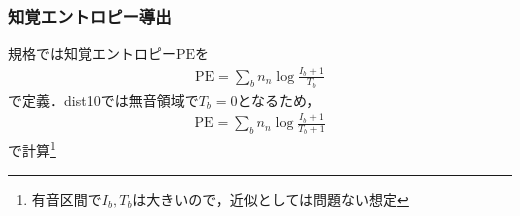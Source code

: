 \documentclass[14pt,xcolor=dvipsnames,table,dvipdfmx]{beamer}
\begin{document}
\begin{frame}[c]
    \frametitle{知覚エントロピー導出}
    規格では知覚エントロピー$\mathrm{PE}$を
    \begin{align}
        \mathrm{PE} = \sum_{b} n_{n} \log \frac{I_{b} + 1}{T_{b}}
    \end{align}
    で定義．dist10では無音領域で$T_{b} = 0$となるため，
    \begin{align}
        \mathrm{PE} = \sum_{b} n_{n} \log \frac{I_{b} + 1}{T_{b} + 1}
    \end{align}
    で計算\footnote{有音区間で$I_{b}, T_{b}$は大きいので，近似としては問題ない想定}
\end{frame}
\end{document}
